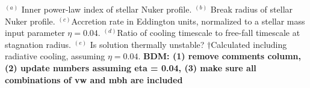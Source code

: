 \documentclass[usenatbib,fleqn]{mn2e}
\begin{document}
\begin{table}
\begin{minipage}{18cm}
$^{(a)}$ Inner power-law index of stellar Nuker profile.  $^{(b)}$ Break radius of stellar Nuker profile.  $^{(c)}$Accretion rate in Eddington units, normalized to a stellar mass input parameter $\eta = 0.04$.  $^{(d)}$Ratio of cooling timescale to free-fall timescale at stagnation radius.  $^{(e)}$ Is solution thermally unstable?  $\dagger$Calculated including radiative cooling, assuming $\eta = 0.04$.  {\bf BDM: (1) remove comments column, (2) update numbers assuming eta = 0.04, (3) make sure all combinations of vw and mbh are included}
\end{minipage}
\end{table}
\end{document}
